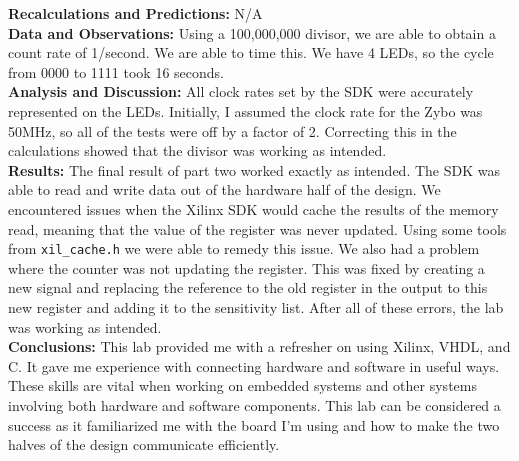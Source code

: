 \documentclass{article}
\begin{document}
\noindent \textbf{Recalculations and Predictions:} N/A\\

\noindent \textbf{Data and Observations:} Using a 100,000,000 divisor, we are able to obtain a count rate of 1/second. We are able to time this. We have 4 LEDs, so the cycle from 0000 to 1111 took 16 seconds.\\

\noindent \textbf{Analysis and Discussion:} All clock rates set by the SDK were accurately represented on the LEDs. Initially, I assumed the clock rate for the Zybo was 50MHz, so all of the tests were off by a factor of 2. Correcting this in the calculations showed that the divisor was working as intended.\\

\noindent \textbf{Results:} The final result of part two worked exactly as intended. The SDK was able to read and write data out of the hardware half of the design. We encountered issues when the Xilinx SDK would cache the results of the memory read, meaning that the value of the register was never updated. Using some tools from \texttt{xil\_cache.h} we were able to remedy this issue. We also had a problem where the counter was not updating the register. This was fixed by creating a new signal and replacing the reference to the old register in the output to this new register and adding it to the sensitivity list. After all of these errors, the lab was working as intended.\\

\noindent \textbf{Conclusions:} This lab provided me with a refresher on using Xilinx, VHDL, and C. It gave me experience with connecting hardware and software in useful ways. These skills are vital when working on embedded systems and other systems involving both hardware and software components. This lab can be considered a success as it familiarized me with the board I'm using and how to make the two halves of the design communicate efficiently.

\thispagestyle{empty}
\end{document}
